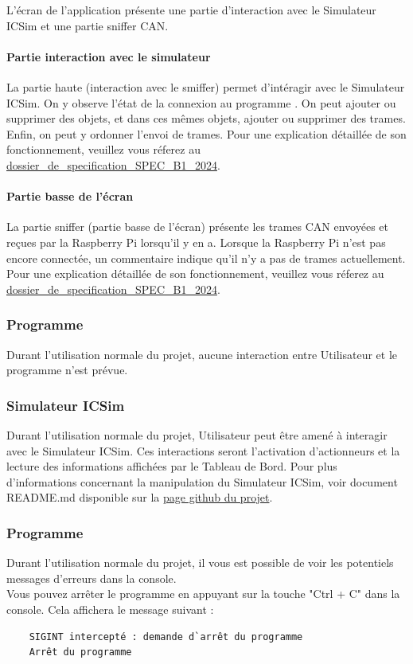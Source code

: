 L'écran de l'application {\nomApplication} présente une partie d'interaction avec le Simulateur ICSim et une partie sniffer CAN.

\paragraph{Partie interaction avec le simulateur}
\medskip
La partie {\guillemetleft} haute {\guillemetright} (interaction avec le smiffer) permet d'intéragir avec le Simulateur ICSim. On y observe l'état de la connexion au programme {\nomLogiciel}. On peut ajouter ou supprimer des objets, et dans ces mêmes objets, ajouter ou supprimer des trames. Enfin, on peut y ordonner l'envoi de trames. Pour une explication détaillée de son fonctionnement, veuillez vous réferez au \hyperref[SPEC]{dossier\_de\_specification\_SPEC\_B1\_2024}.

\paragraph{Partie basse de l'écran}
La partie sniffer (partie basse de l'écran) présente les trames CAN envoyées et reçues par la Raspberry Pi lorsqu'il y en a. Lorsque la Raspberry Pi n'est pas encore connectée, un commentaire indique qu'il n'y a pas de trames actuellement. Pour une explication détaillée de son fonctionnement, veuillez vous réferez au \hyperref[SPEC]{dossier\_de\_specification\_SPEC\_B1\_2024}.

\subsubsection{Programme {\nomLogiciel}}
Durant l'utilisation normale du projet, aucune interaction entre Utilisateur et le programme {\nomLogiciel} n'est prévue.

\subsubsection{Simulateur ICSim}
Durant l'utilisation normale du projet, Utilisateur peut être amené à interagir avec le Simulateur ICSim. Ces interactions seront l'activation d'actionneurs et la lecture des informations affichées par le Tableau de Bord.
\newline
Pour plus d'informations concernant la manipulation du Simulateur ICSim, voir document README.md disponible sur la {\href{https://github.com/zombieCraig/ICSim}{page github du projet}}.


\subsubsection{Programme {\nomLogiciel}}
Durant l'utilisation normale du projet, il vous est possible de voir les potentiels messages d'erreurs dans la console. \\
Vous pouvez arrêter le programme {\nomLogiciel} en appuyant sur la touche "Ctrl + C" dans la console. Cela affichera le message suivant :
\vspace{-1.8\baselineskip}
\begin{lstlisting}
    SIGINT intercepté : demande d`arrêt du programme
    Arrêt du programme
\end{lstlisting}

